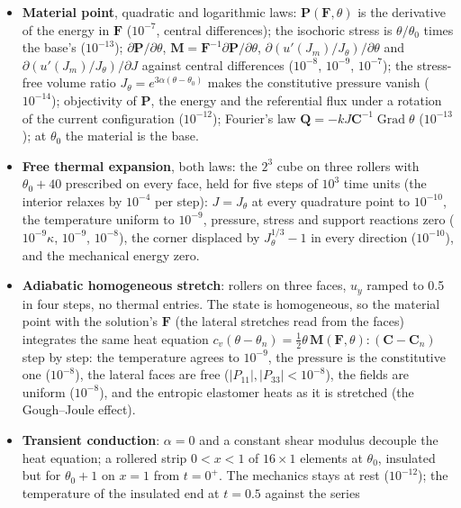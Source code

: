 \documentclass[11pt]{article}
\newcommand{\Grad}{\operatorname{Grad}}
\newcommand{\bP}{\bm{P}}
\newcommand{\bF}{\bm{F}}
\newcommand{\bC}{\bm{C}}
\newcommand{\bQ}{\bm{Q}}
\newcommand{\bM}{\bm{M}}
\begin{document}
\begin{itemize}[nosep]
  \item \textbf{Material point}, quadratic and logarithmic laws: $\bP(\bF, \theta)$
    is the derivative of the energy in $\bF$ ($10^{-7}$, central
    differences); the isochoric stress is $\theta/\theta_0$ times the base's
    ($10^{-13}$); $\partial\bP/\partial\theta$, $\bM = \bF^{-1}\partial\bP/\partial\theta$,
    $\partial(u'(J_m)/J_\theta)/\partial\theta$ and $\partial(u'(J_m)/J_\theta)/\partial J$
    against central differences ($10^{-8}$, $10^{-9}$, $10^{-7}$); the
    stress-free volume ratio $J_\theta = e^{3\alpha(\theta - \theta_0)}$ makes
    the constitutive pressure vanish ($10^{-14}$); objectivity of $\bP$, the
    energy and the referential flux under a rotation of the current
    configuration ($10^{-12}$); Fourier's law $\bQ = -kJ\bC^{-1}\Grad\theta$
    ($10^{-13}$); at $\theta_0$ the material is the base.
  \item \textbf{Free thermal expansion}, both laws: the $2^3$ cube on three
    rollers with $\theta_0 + 40$ prescribed on every face, held for five
    steps of $10^3$ time units (the interior relaxes by $10^{-4}$ per step):
    $J = J_\theta$ at every quadrature point to $10^{-10}$, the temperature
    uniform to $10^{-9}$, pressure, stress and support reactions zero
    ($10^{-9}\kappa$, $10^{-9}$, $10^{-8}$), the corner displaced by
    $J_\theta^{1/3} - 1$ in every direction ($10^{-10}$), and the mechanical
    energy zero.
  \item \textbf{Adiabatic homogeneous stretch}: rollers on three faces,
    $u_y$ ramped to 0.5 in four steps, no thermal entries.  The state is
    homogeneous, so the material point with the solution's $\bF$ (the
    lateral stretches read from the faces) integrates the same heat equation
    $c_v(\theta - \theta_n) = \tfrac12\theta\,\bM(\bF, \theta):(\bC - \bC_n)$
    step by step: the temperature agrees to $10^{-9}$, the pressure is the
    constitutive one ($10^{-8}$), the lateral faces are free ($|P_{11}|, |P_{33}| < 10^{-8}$),
    the fields are uniform ($10^{-8}$), and the entropic elastomer heats as
    it is stretched (the Gough--Joule effect).
  \item \textbf{Transient conduction}: $\alpha = 0$ and a constant shear
    modulus decouple the heat equation; a rollered strip $0 < x < 1$ of
    $16\times1$ elements at $\theta_0$, insulated but for $\theta_0 + 1$ on
    $x = 1$ from $t = 0^+$.  The mechanics stays at rest ($10^{-12}$); the
    temperature of the insulated end at $t = 0.5$ against the series

\end{itemize}
\end{document}
